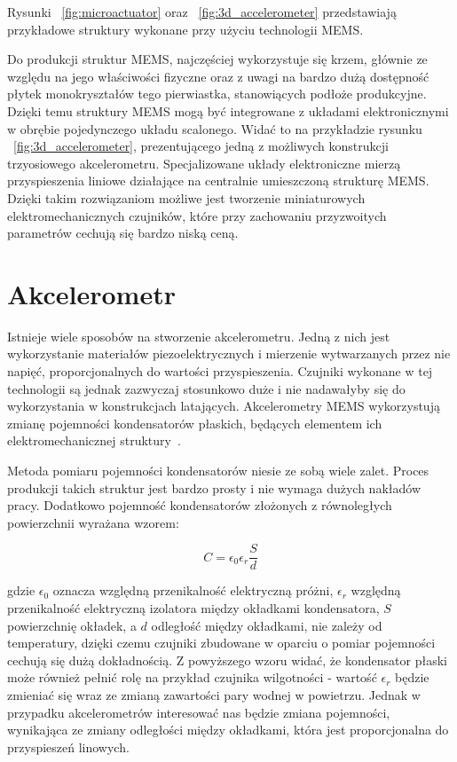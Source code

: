 Rysunki ~\ref{fig:microactuator} oraz ~\ref{fig:3d_accelerometer} przedstawiają przykładowe struktury wykonane przy użyciu technologii MEMS. 

Do produkcji struktur MEMS, najczęściej wykorzystuje się krzem, głównie ze względu na jego właściwości fizyczne oraz z uwagi na bardzo dużą dostępność płytek monokryształów tego pierwiastka, stanowiących podłoże produkcyjne. Dzięki temu struktury MEMS mogą być integrowane z układami elektronicznymi w obrębie pojedynczego układu scalonego. Widać to na przykładzie rysunku ~\ref{fig:3d_accelerometer}, prezentującego jedną z możliwych konstrukcji trzyosiowego akcelerometru. Specjalizowane układy elektroniczne mierzą przyspieszenia liniowe działające na centralnie umieszczoną strukturę MEMS. Dzięki takim rozwiązaniom możliwe jest tworzenie miniaturowych elektromechanicznych czujników, które przy zachowaniu przyzwoitych parametrów cechują się bardzo niską ceną.   

\section{Akcelerometr}

Istnieje wiele sposobów na stworzenie akcelerometru. Jedną z nich jest wykorzystanie materiałów piezoelektrycznych i mierzenie wytwarzanych przez nie napięć, proporcjonalnych do wartości przyspieszenia. Czujniki wykonane w tej technologii są jednak zazwyczaj stosunkowo duże i nie nadawałyby się do wykorzystania w konstrukcjach latających. Akcelerometry MEMS wykorzystują zmianę pojemności kondensatorów płaskich, będących elementem ich elektromechanicznej struktury~\cite{mems12}.

Metoda pomiaru pojemności kondensatorów niesie ze sobą wiele zalet. Proces produkcji takich struktur jest bardzo prosty i nie wymaga dużych nakładów pracy. Dodatkowo pojemność kondensatorów złożonych z równoległych powierzchnii wyrażana wzorem:   

\begin{equation}
C = \epsilon_0\epsilon_r\frac{S}{d}
\end{equation}

gdzie $\epsilon_0$ oznacza względną przenikalność elektryczną próżni, $\epsilon_r$ względną przenikalność elektryczną izolatora między okładkami kondensatora, $S$ powierzchnię okładek, a $d$ odległość między okładkami, nie zależy od temperatury, dzięki czemu czujniki zbudowane w oparciu o pomiar pojemności cechują się dużą dokładnością. Z powyższego wzoru widać, że kondensator płaski może również pełnić rolę na przykład czujnika wilgotności - wartość $\epsilon_r$ będzie zmieniać się wraz ze zmianą zawartości pary wodnej w powietrzu. Jednak w przypadku akcelerometrów interesować nas będzie zmiana pojemności, wynikająca ze zmiany odległości między okładkami, która jest proporcjonalna do przyspieszeń linowych.

